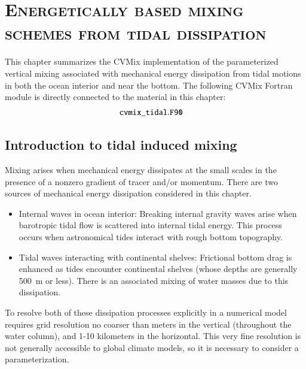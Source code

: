 \chapter{\scshape Energetically based mixing schemes from tidal dissipation}
\label{chapter:cvmix_tidal}


\minitoc
\vspace{.5cm}

\begin{mdframed}[backgroundcolor=lightgray!50]
  This chapter summarizes the CVMix implementation of the
  parameterized vertical mixing associated with mechanical energy
  dissipation from tidal motions in both the ocean interior and near
  the bottom.  The following CVMix Fortran module is directly
  connected to the material in this chapter:
\begin{align*} 
 &{\tt cvmix\_tidal.F90}
\end{align*}
\end{mdframed}

\section{Introduction to tidal induced mixing}
\label{section:vert_tidal_intro}

Mixing arises when mechanical energy dissipates at the small scales in
the presence of a nonzero gradient of tracer and/or momentum.  There
are two sources of mechanical energy dissipation considered in this
chapter.
\begin{itemize}

\item {\sc Internal waves in ocean interior}: Breaking internal
  gravity waves arise when barotropic tidal flow is scattered into
  internal tidal energy. This process occurs when astronomical tides
  interact with rough bottom topography.

\item {\sc Tidal waves interacting with continental shelves}:
  Frictional bottom drag is enhanced as tides encounter continental
  shelves (whose depths are generally 500~m or less).  There is an
  associated mixing of water masses due to this dissipation.

\end{itemize}
To resolve both of these dissipation processes explicitly in a
numerical model requires grid resolution no coarser than meters in the
vertical (throughout the water column), and 1-10 kilometers in the
horizontal.  This very fine resolution is not generally accessible to
global climate models, so it is necessary to consider a
parameterization.


